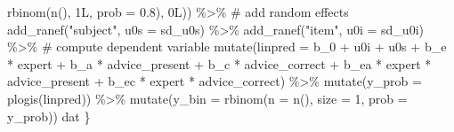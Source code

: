 \documentclass[
  man,
  floatsintext,
  longtable,
  a4paper,
  nolmodern,
  notxfonts,
  notimes,
  colorlinks=true,linkcolor=blue,citecolor=blue,urlcolor=blue]{apa7}
\newenvironment{Shaded}{\begin{snugshade}}{\end{snugshade}}
\newcommand{\AttributeTok}[1]{\textcolor[rgb]{0.40,0.45,0.13}{#1}}
\newcommand{\CommentTok}[1]{\textcolor[rgb]{0.37,0.37,0.37}{#1}}
\newcommand{\DecValTok}[1]{\textcolor[rgb]{0.68,0.00,0.00}{#1}}
\newcommand{\FloatTok}[1]{\textcolor[rgb]{0.68,0.00,0.00}{#1}}
\newcommand{\FunctionTok}[1]{\textcolor[rgb]{0.28,0.35,0.67}{#1}}
\newcommand{\NormalTok}[1]{\textcolor[rgb]{0.00,0.23,0.31}{#1}}
\newcommand{\SpecialCharTok}[1]{\textcolor[rgb]{0.37,0.37,0.37}{#1}}
\newcommand{\StringTok}[1]{\textcolor[rgb]{0.13,0.47,0.30}{#1}}
\begin{document}
\begin{Shaded}
\begin{Highlighting}[]
                                    \FunctionTok{rbinom}\NormalTok{(}\FunctionTok{n}\NormalTok{(), }\DecValTok{1}\NormalTok{L, }\AttributeTok{prob =} \FloatTok{0.8}\NormalTok{), }\DecValTok{0}\NormalTok{L)) }\SpecialCharTok{\%\textgreater{}\%}
    \CommentTok{\# add random effects}
    \FunctionTok{add\_ranef}\NormalTok{(}\StringTok{"subject"}\NormalTok{, }\AttributeTok{u0s =}\NormalTok{ sd\_u0s) }\SpecialCharTok{\%\textgreater{}\%}
    \FunctionTok{add\_ranef}\NormalTok{(}\StringTok{"item"}\NormalTok{, }\AttributeTok{u0i =}\NormalTok{ sd\_u0i) }\SpecialCharTok{\%\textgreater{}\%}
    \CommentTok{\# compute dependent variable}
    \FunctionTok{mutate}\NormalTok{(}\AttributeTok{linpred =}\NormalTok{ b\_0 }\SpecialCharTok{+}\NormalTok{ u0i }\SpecialCharTok{+}\NormalTok{ u0s }\SpecialCharTok{+}
\NormalTok{      b\_e }\SpecialCharTok{*}\NormalTok{ expert }\SpecialCharTok{+}\NormalTok{ b\_a }\SpecialCharTok{*}\NormalTok{ advice\_present }\SpecialCharTok{+}\NormalTok{ b\_c }\SpecialCharTok{*}\NormalTok{ advice\_correct }\SpecialCharTok{+}
\NormalTok{      b\_ea }\SpecialCharTok{*}\NormalTok{ expert }\SpecialCharTok{*}\NormalTok{ advice\_present }\SpecialCharTok{+}\NormalTok{ b\_ec }\SpecialCharTok{*}\NormalTok{ expert }\SpecialCharTok{*}\NormalTok{ advice\_correct) }\SpecialCharTok{\%\textgreater{}\%}
    \FunctionTok{mutate}\NormalTok{(}\AttributeTok{y\_prob =} \FunctionTok{plogis}\NormalTok{(linpred)) }\SpecialCharTok{\%\textgreater{}\%}
    \FunctionTok{mutate}\NormalTok{(}\AttributeTok{y\_bin =} \FunctionTok{rbinom}\NormalTok{(}\AttributeTok{n =} \FunctionTok{n}\NormalTok{(), }\AttributeTok{size =} \DecValTok{1}\NormalTok{, }\AttributeTok{prob =}\NormalTok{ y\_prob))}
\NormalTok{  dat}
\NormalTok{\}}
\end{Highlighting}
\end{Shaded}
\end{document}
